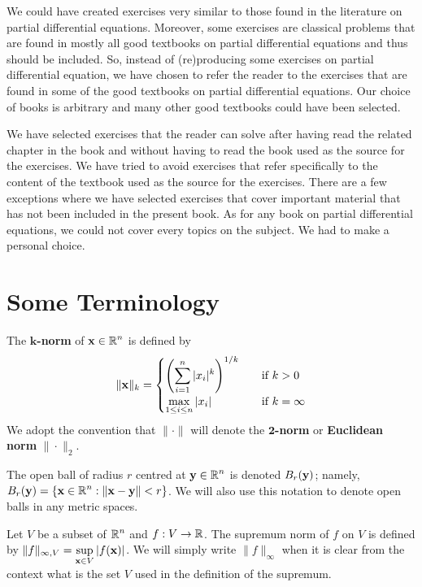 We could have created exercises very similar to those found in the
literature on partial differential equations.  Moreover, some
exercises are classical problems that are found in mostly all good textbooks on
partial differential equations and thus should be included.  So, instead of
(re)producing some exercises on partial differential equation, we have
chosen to refer the reader to the exercises that are found in some of
the good textbooks on partial differential equations.  Our choice of
books is arbitrary and many other good textbooks could have been selected.

We have selected exercises that the reader can solve after having read
the related chapter in the book and without having to read the book
used as the source for the exercises.  We have tried to avoid exercises
that refer specifically to the content of the textbook used as the
source for the exercises.  There are a few exceptions where
we have selected exercises that cover important material that has not
been included in the present book.  As for any book on partial
differential equations, we could not cover every topics on the
subject.  We had to make a personal choice.

\section*{Some Terminology}

The {\bfseries $\mathbf{k}$-norm} of
$\displaystyle \mathbf{x} \in \mathbb{R}^n$ is defined by
\[
\|\mathbf{x}\|_k =
\begin{cases}
\displaystyle \left(\sum_{i=1}^n |x_i|^k\right)^{1/k} & \quad \text{if}\ k > 0 \\
\displaystyle \max_{1\leq i \leq n} |x_i| & \quad \text{if} \ k = \infty  
\end{cases}
\]
We adopt the convention that $\|\cdot\|$ will denote the
{\bfseries $\mathbf{2}$-norm} or
{\bfseries Euclidean norm} $\|\cdot\|_2$.

The open ball of radius $r$ centred at $\displaystyle \mathbf{y} \in \mathbb{R}^n$
is denoted $\displaystyle B_r(\mathbf{y})$; namely,\\
$\displaystyle B_r(\mathbf{y}) = \left\{ \mathbf{x} \in \mathbb{R}^n :
\left\|\mathbf{x}-\mathbf{y} \right\| < r \right\}$.  We will also use this
notation to denote open balls in any metric spaces.

Let $V$ be a subset of $\displaystyle \mathbb{R}^n$ and $f:V \to \mathbb{R}$.  The
supremum norm of $f$ on $V$ is defined by
$\displaystyle \|f\|_{\infty,V} = \sup_{\mathbf{x}\in V} |f(\mathbf{x})|$.
We will simply write $\|f\|_\infty$ when it is clear from the context
what is the set $V$ used in the definition of the supremum.

